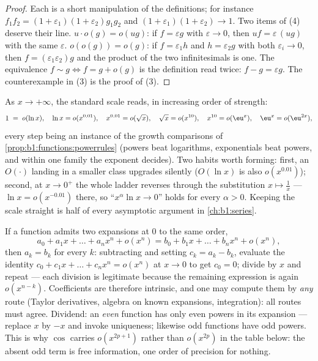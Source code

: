 \begin{proof}
Each is a short manipulation of the definitions; for instance
$f_1 f_2 = (1+\varepsilon_1)(1+\varepsilon_2) g_1 g_2$ and $(1 +
\varepsilon_1)(1+\varepsilon_2) \to 1$. Two items of (4) deserve
their line. $u\cdot o(g) = o(ug)$: if $f = \varepsilon g$ with
$\varepsilon \to 0$, then $uf = \varepsilon\,(ug)$ with the same
$\varepsilon$. $o(o(g)) = o(g)$: if $f = \varepsilon_1 h$ and
$h = \varepsilon_2 g$ with both $\varepsilon_i \to 0$, then $f =
(\varepsilon_1\varepsilon_2) g$ and the product of the two
infinitesimals is one. The equivalence $f \sim g \iff f = g +
o(g)$ is the definition read twice: $f - g = \varepsilon g$.
The counterexample in (3) is the proof of (3).
\end{proof}

\begin{example}\label{ex:b1:taylor:scale}
As $x \to +\infty$, the standard scale reads, in increasing
order of strength:
\[
1 \;=\; o(\ln x), \quad
\ln x = o(x^{0.01}), \quad
x^{0.01} = o(\sqrt x), \quad
\sqrt x = o(x^{10}), \quad
x^{10} = o(\eu^{x}), \quad
\eu^x = o(\eu^{2x}) ,
\]
every step being an instance of the growth comparisons of
\cref{prop:b1:functions:powerrules} (powers beat logarithms,
exponentials beat powers, and within one family the exponent
decides). Two habits worth forming: first, an $O(\cdot)$ landing
in a smaller class upgrades silently ($O(\ln x)$ is also
$o(x^{0.01})$); second, at $x \to 0^+$ the whole ladder
reverses through the substitution $x \mapsto \frac1x$ ---
$\ln x = o(x^{-0.01})$ there, so ``$x^\alpha \ln x \to 0$''
holds for every $\alpha > 0$. Keeping the scale straight is
half of every asymptotic argument in
\cref{ch:b1:series}.
\end{example}

\begin{example}\label{ex:b1:taylor:uniqueness}
If a function admits two expansions at $0$ to the same order,
\[
a_0 + a_1 x + \dots + a_n x^n + o(x^n)
= b_0 + b_1 x + \dots + b_n x^n + o(x^n),
\]
then $a_k = b_k$ for every $k$: subtracting and setting $c_k =
a_k - b_k$, evaluate the identity $c_0 + c_1 x + \dots + c_n x^n
= o(x^n)$ at $x \to 0$ to get $c_0 = 0$; divide by $x$ and
repeat --- each division is legitimate because the remaining
expression is again $o(x^{n-k})$. Coefficients are therefore
intrinsic, and one may compute them by \emph{any} route (Taylor
derivatives, algebra on known expansions, integration): all
routes must agree. Dividend: an \emph{even} function has only
even powers in its expansion --- replace $x$ by $-x$ and invoke
uniqueness; likewise odd functions have odd powers. This is why
$\cos$ carries $o(x^{2p+1})$ rather than $o(x^{2p})$ in the
table below: the absent odd term is free information, one order
of precision for nothing.
\end{example}


